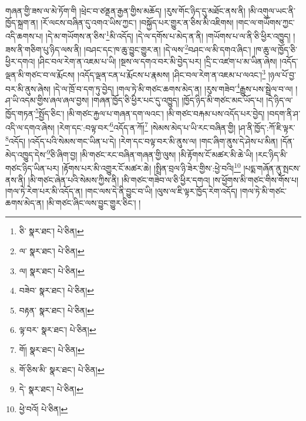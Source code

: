 གཞན་གྱི་ཟས་ལ་མེ་ཏོག་གི །ཕྲེང་བ་ཙནྡན་རྒྱན་གྱིས་མཆོད། །རུས་གོང་ཉིད་དུ་མཐོང་ནས་ནི། །མི་འགུལ་ཡང་ནི་ཁྱོད་སྐྲག་ན། །རོ་ལངས་བཞིན་དུ་འགའ་ཡིས་ཀྱང་། །བསྐྱོད་པར་གྱུར་ན་ཅིས་མི་འཇིགས། །གང་ལ་གཡོགས་ཀྱང་འདི་ཆགས་པ། །དེ་མ་གཡོགས་ན་ཅིས་\footnote{ཅི་  སྣར་ཐང་།  པེ་ཅིན། }མི་འདོད། །དེ་ལ་དགོས་པ་མེད་ན་ནི། །གཡོགས་པ་ལ་ནི་ཅི་ཕྱིར་འཁྱུད། །ཟས་ནི་གཅིག་པུ་ཉིད་ལས་ནི། །བཤང་དང་ཁ་ཆུ་བྱུང་གྱུར་ན། །དེ་ལས་\footnote{ལ་  སྣར་ཐང་།  པེ་ཅིན། }བཤང་ལ་མི་དགའ་ཞིང་། །ཁ་ཆུ་ལ་ཁྱོད་ཅི་ཕྱིར་དགའ། །ཤིང་བལ་རེག་ན་འཇམ་པ་ཡི། །སྔས་ལ་དགའ་བར་མི་བྱེད་པར། །དྲི་ང་འཛག་པ་མ་ཡིན་ཞེས། །འདོད་ལྡན་མི་གཙང་བ་ལ་རྨོངས། །འདོད་ལྡན་ངན་པ་རྨོངས་པ་རྣམས། །ཤིང་བལ་རེག་ན་འཇམ་པ་ལའང་།\footnote{ལ།  སྣར་ཐང་།  པེ་ཅིན། } །ཉལ་པོ་བྱ་བར་མི་ནུས་ཞེས། །དེ་ལ་ཁྲོ་བ་དག་ཏུ་བྱེད། །གལ་ཏེ་མི་གཙང་ཆགས་མེད་ན། །རུས་གཟེབ་\footnote{བཟེབ་  སྣར་ཐང་།  པེ་ཅིན། }རྒྱུས་པས་སྦྲེལ་བ་ལ། །ཤ་ཡི་འདམ་གྱིས་ཞལ་ཞལ་བྱས། །གཞན་ཁྱོད་ཅི་ཕྱིར་པང་དུ་འཁྱུད། །ཁྱོད་ཉིད་མི་གཙང་མང་ཡོད་པ། །དེ་ཉིད་ལ་ཁྱོད་གཏན་\footnote{བརྟན་  སྣར་ཐང་།  པེ་ཅིན། }སྤྱོད་ཅིང་། །མི་གཙང་རྐྱལ་པ་གཞན་དག་ལའང་། །མི་གཙང་བརྐམ་པས་འདོད་པར་བྱེད། །བདག་ནི་ཤ་འདི་ལ་དགའ་ཞེས། །རེག་དང་:བལྟ་བར་\footnote{ལྟ་བར་  སྣར་ཐང་།  པེ་ཅིན། }འདོད་ན་ཀོ།\footnote{གོ།  སྣར་ཐང་།  པེ་ཅིན། } །སེམས་མེད་པ་ཡི་རང་བཞིན་གྱི། །ཤ་ནི་ཁྱོད་:ཀོ་ཇི་ལྟར་\footnote{གོ་ཅིས་མི་  སྣར་ཐང་།  པེ་ཅིན། }འདོད། །འདོད་པའི་སེམས་གང་ཡིན་པ་དེ། །རེག་དང་བལྟ་བར་མི་ནུས་ལ། །གང་ཞིག་ནུས་དེ་ཤེས་པ་མིན། །དོན་མེད་འཁྱུད་དེས་\footnote{དེ་  སྣར་ཐང་།  པེ་ཅིན། }ཅི་ཞིག་བྱ། །མི་གཙང་རང་བཞིན་གཞན་གྱི་ལུས། །མི་རྟོགས་ངོ་མཚར་མི་ཆེ་ཡི། །རང་ཉིད་མི་གཙང་ཉིད་ཡིན་པར། །རྟོགས་པར་མི་འགྱུར་ངོ་མཚར་ཆེ། །སྤྲིན་བྲལ་ཉི་ཟེར་གྱིས་:ཕྱེ་བའི།\footnote{ཕྱེ་བའོ།  པེ་ཅིན། } །པདྨ་གཞོན་ནུ་སྤངས་ནས་ནི། །མི་གཙང་ཞེན་པའི་སེམས་ཀྱིས་ནི། །མི་གཙང་གཟེབ་ལ་ཅི་ཕྱིར་དགའ། །ས་ཕྱོགས་མི་གཙང་གིས་གོས་པ། །གལ་ཏེ་རེག་པར་མི་འདོད་ན། །གང་ལས་དེ་ནི་བྱུང་བ་ཡི། །ལུས་ལ་ཇི་ལྟར་ཁྱོད་རེག་འདོད། །གལ་ཏེ་མི་གཙང་ཆགས་མེད་ན། །མི་གཙང་ཞིང་ལས་བྱུང་གྱུར་ཅིང་། །
